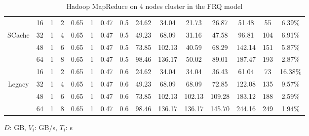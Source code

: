 {\begin{table}
{\begin{tabular}{|c||c|c|c|c|c|c|c||c|c|c|c|c|c|c|}
	\hline
	& 16	& 1	& 2 &	0.65 &	1 &	0.47 &	0.5 &	24.62 &		34.04	 &	21.73 &	26.87 &	51.48	& 55  &		6.39\% \\
	SCache
	& 32	& 1	& 4 &	0.65 &	1 &	0.47 &	0.5 &	49.23 &		68.09	 &	31.16 &	47.58 &	96.81	& 104 & 	6.91\% \\
	& 48	& 1	& 6 &	0.65 &	1 &	0.47 &	0.5 &	73.85 &		102.13 &	40.59 &	68.29 &	142.14	& 151 & 	5.87\% \\
	& 64	& 1	& 8 &	0.65 &	1 &	0.47 &	0.5 &	98.46 &		136.17 &	50.02 &	89.01 &	187.47	& 193 & 	2.87\% \\
	\hline
	& 16	& 1 & 2 &	0.65 &	1 &	0.47 &	0.6 &	24.62 &		34.04	&	34.04	&	36.43	&	61.04	&	73	&	16.38\%	\\
	Legacy
	& 32	& 1 & 4 &	0.65 &	1 &	0.47 &	0.6 &	49.23 &		68.09	&	68.09	&	72.85	&	122.08	&	135	&	9.57\%	\\
	& 48	& 1 & 6 &	0.65 &	1 &	0.47 &	0.6 &	73.85 &		102.13	&	102.13	&	109.28	&	183.12	&	188	&	2.59\%	\\
	& 64	& 1 & 8 &	0.65 &	1 &	0.47 &	0.6 &	98.46 &		136.17	&	136.17	&	145.70	&	244.16	&	249	&	1.94\%	\\
	\hline
	\end{tabular}
}
\(D\): GB, \(V_{i}\): GB/s, \(T_{i}\): s
\caption{\color{black}Hadoop MapReduce on 4 nodes cluster in the FRQ model}
\label{table1}
\end{table}

\begin{table}
\centering
{}
\end{table}}
